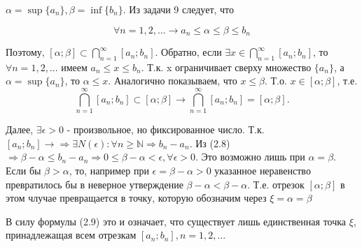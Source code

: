 \documentclass[10pt]{article}
\begin{document}
\begin{solution}
$\alpha=\sup\{a_n\},\beta=\inf\{b_n\}$. Из задачи 9 следует, что 

\begin{equation}
\forall n=1,2,... \rightarrow a_n \leq \alpha \leq \beta \leq b_n
\end{equation}

Поэтому, $[\alpha;\beta]\subset\bigcap_{n=1}^{\infty} [a_n;b_n].$ Обратно, если $\exists x \in\bigcap_{n=1}^{\infty} [a_n;b_n]$, то $\forall n =1,2,...$ имеем $a_n \leq x \leq b_n$.
Т.к. x ограничивает сверху множество $\{a_n\}$, а $\alpha=\sup\{a_n\}$, то $\alpha \leq x$. Аналогично показываем, что $x\leq \beta$. Т.о. $x \in [\alpha;\beta]$, т.е. 
\begin{equation}
\bigcap_{n=1}^{\infty} [a_n;b_n]\subset[\alpha;\beta]\rightarrow\bigcap_{n=1}^{\infty} [a_n;b_n]=[\alpha;\beta].
\end{equation}

Далее, $\exists \epsilon >0$ - произвольное, но фиксированное число. Т.к. $[a_n;b_n]\rightarrow \Rightarrow \exists N(\epsilon): \forall n \geq \mathbb{N} \Rightarrow b_n - a_n$.
Из (2.8) $\Rightarrow \beta-\alpha \leq b_n-a_n \Rightarrow 0 \leq \beta-\alpha < \epsilon, \forall \epsilon>0$. Это возможно лишь при $\alpha=\beta$. Если бы $\beta>\alpha$, то, например при $\epsilon=\beta-\alpha>0$ указанное неравенство превратилось бы в неверное
утверждение $\beta-\alpha<\beta-\alpha$. Т.е. отрезок $[\alpha;\beta]$ в этом члучае превращается в точку, которую обозначим через   $\xi=\alpha=\beta$ 

В силу формулы (2.9) это и означает, что существует лишь единственная точка $\xi$, принадлежащая всем отрезкам $[a_n;b_n], n=1,2,...$



\end{solution}
\end{document}
